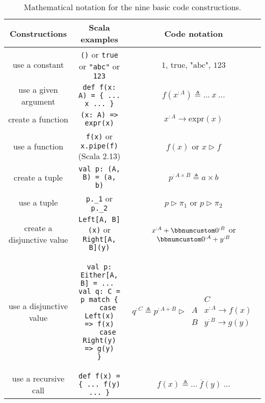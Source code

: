 \begin{table}
\begin{centering}
\begin{tabular}{|c|c|c|}
\hline 
\textbf{\small{}Constructions} & \textbf{\small{}Scala examples} & \textbf{\small{}Code notation}\tabularnewline
\hline 
\hline 
{\small{}use a constant} & {\small{}}\lstinline!()!{\small{} or }\lstinline!true!{\small{}
or }\lstinline!"abc"!{\small{} or }\lstinline!123! & {\small{}$1$, $\text{true}$, $\text{"abc"}$, $123$}\tabularnewline
\hline 
{\small{}use a given argument} & {\small{}}\lstinline!def f(x: A) = { ... x ... }! & {\small{}$f(x^{:A})\triangleq...~x~...$}\tabularnewline
\hline 
{\small{}create a function} & {\small{}}\lstinline!(x: A) => expr(x)! & {\small{}$x^{:A}\rightarrow\text{expr}\left(x\right)$}\tabularnewline
\hline 
{\small{}use a function} & {\small{}}\lstinline!f(x)!{\small{} or }\lstinline!x.pipe(f)!{\small{}
(Scala 2.13)} & {\small{}$f(x)$ or $x\triangleright f$}\tabularnewline
\hline 
{\small{}create a tuple} & {\small{}}\lstinline!val p: (A, B) = (a, b)! & {\small{}$p^{:A\times B}\triangleq a\times b$}\tabularnewline
\hline 
{\small{}use a tuple} & {\small{}}\lstinline!p._1!{\small{} or }\lstinline!p._2! & {\small{}$p\triangleright\pi_{1}$ or $p\triangleright\pi_{2}$}\tabularnewline
\hline 
{\small{}create a disjunctive value} & {\small{}}\lstinline!Left[A, B](x)!{\small{} or }\lstinline!Right[A, B](y)! & {\small{}$x^{:A}+\bbnum 0^{:B}$ or $\bbnum 0^{:A}+y^{:B}$}\tabularnewline
\hline 
{\small{}use a disjunctive value} & {\small{}\hspace*{-0.013\linewidth}}%
\begin{minipage}[c][1\totalheight][b]{0.33\columnwidth}%
{\small{}\vspace{0.14\baselineskip}
}
\begin{lstlisting}
val p: Either[A, B] = ... 
val q: C = p match {
    case Left(x)   => f(x)
    case Right(y)  => g(y)
}
\end{lstlisting}
{\small{}\vspace{-0.1\baselineskip}
}%
\end{minipage}{\small{} \hspace*{-0.009\linewidth}} & {\small{}$q^{:C}\triangleq p^{:A+B}\triangleright\,\begin{array}{|c||c|}
 & C\\
\hline A & x^{:A}\rightarrow f(x)\\
B & y^{:B}\rightarrow g(y)
\end{array}$}\tabularnewline
\hline 
{\small{}use a recursive call} & {\small{}}\lstinline!def f(x) = { ... f(y) ... }! & {\small{}$f(x)\triangleq...~\overline{f}(y)~...$}\tabularnewline
\hline 
\end{tabular}
\par\end{centering}
\caption{Mathematical notation for the nine basic code constructions.\label{tab:Mathematical-notation-for-basic-code-constructions}}
\end{table}


